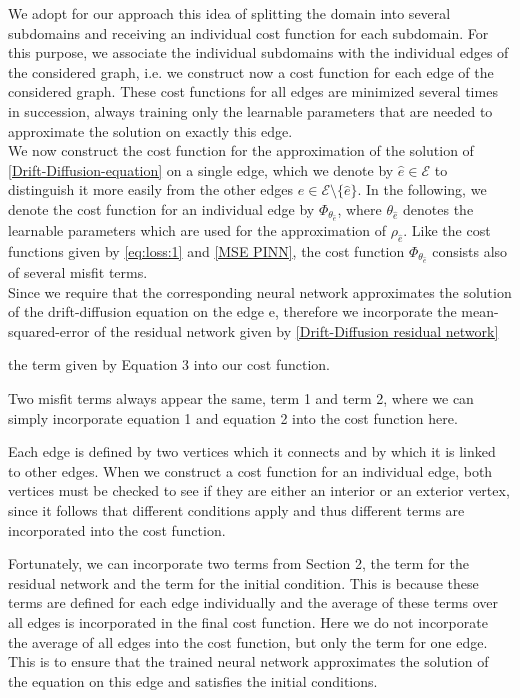 We adopt for our approach this idea of splitting the domain into several subdomains and receiving an individual cost function for each subdomain. For this purpose, we associate the individual subdomains with the individual edges of the considered graph, i.e. we construct now a cost function for each edge of the considered graph. These cost functions for all edges are minimized several times in succession, always training only the learnable parameters that are needed to approximate the solution on exactly this edge.\\
We now construct the cost function for the approximation of the solution of \cref{Drift-Diffusion-equation} on a single edge, which we denote by $\hat{e} \in \mathcal{E}$ to distinguish it more easily from the other edges $e \in \mathcal{E} \setminus \{ \hat{e}\}$. In the following, we denote the cost function for an individual edge by $\Phi_{\theta_{\hat{e}}}$, where $\theta_{\hat{e}}$ denotes the learnable parameters which are used for the approximation of $\rho_{\hat{e}}$. Like the cost functions given by \cref{eq:loss:1} and \cref{MSE PINN}, the cost function $\Phi_{\theta_{\hat{e}}}$ consists also of several misfit terms. \\
Since we require that the corresponding neural network approximates the solution of the drift-diffusion equation on the edge e, therefore we incorporate the mean-squared-error of the residual network given by \cref{Drift-Diffusion residual network}

the term given by Equation 3 into our cost function.  

Two misfit terms always appear the same, term 1 and term 2, where we can simply incorporate equation 1 and equation 2 into the cost function here. 

Each edge is defined by two vertices which it connects and by which it is linked to other edges. When we construct a cost function for an individual edge, both vertices must be checked to see if they are either an interior or an exterior vertex, since it follows that different conditions apply and thus different terms are incorporated into the cost function. 

Fortunately, we can incorporate two terms from Section 2, the term for the residual network and the term for the initial condition. This is because these terms are defined for each edge individually and the average of these terms over all edges is incorporated in the final cost function. Here we do not incorporate the average of all edges into the cost function, but only the term for one edge. This is to ensure that the trained neural network approximates the solution of the equation on this edge and satisfies the initial conditions.  \\

